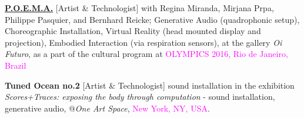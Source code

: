 \documentclass[10pt,letterpaper]{moderncv} %
\begin{document}
	
	
	 {\textbf{\href{https://kivanctatar.com/POEMA}{P.O.E.M.A.}} [Artist \& Technologist] with Regina Miranda, Mirjana Prpa, Philippe Pasquier, and Bernhard Reicke; Generative Audio (quadrophonic setup), Choreographic Installation, Virtual Reality (head mounted display and projection), Embodied Interaction (via respiration sensors), at the gallery \textit{Oi Futuro}, as a part of the cultural program at \textcolor{magenta}{OLYMPICS 2016, Rio de Janeiro, Brazil}}
	
	
	
	
	 {\textbf{Tuned Ocean no.2} [Artist \& Technologist] sound installation in the exhibition \textit{Scores+Traces: exposing the body through computation}  - sound installation, generative audio, @\textit{One Art Space}, \textcolor{magenta}{New York, NY, USA}.}
	
\end{document}
